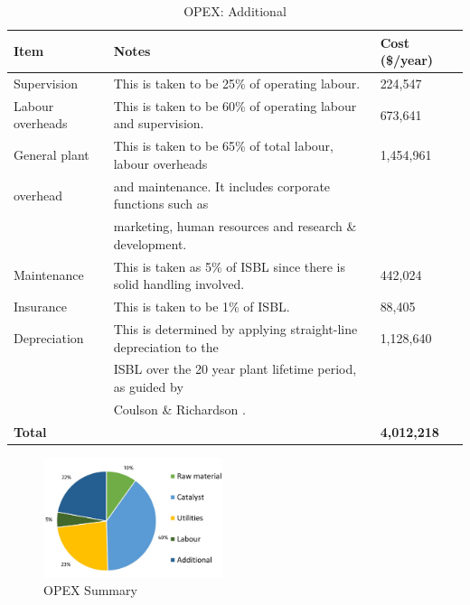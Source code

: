 \begin{table}[H]
\centering
\caption{OPEX: Additional}
\label{tab:opex-add}
\begin{tabular}{@{}lll@{}}
\toprule
\textbf{Item}          & \textbf{Notes}                                                          & \textbf{Cost (\$/year)} \\
\midrule
Supervision            & This is taken to be 25\% of operating labour.                           & 224,547                 \\ \midrule
Labour overheads       & This is taken to be 60\% of operating labour and supervision.           & 673,641                 \\ \midrule
General plant          & This is taken to be 65\% of total labour, labour overheads              & 1,454,961               \\ 
overhead               & and maintenance. It includes corporate functions such as                &                         \\ 
                       & marketing, human resources and research \& development.                 &                         \\ \midrule
Maintenance            & This is taken as 5\% of ISBL since there is solid handling   involved. & 442,024                 \\ \midrule
Insurance              & This is taken to be 1\% of ISBL.                                        & 88,405                  \\ \midrule
Depreciation           & This is determined by applying straight-line depreciation to the        & 1,128,640               \\ 
                       & ISBL over the 20 year plant lifetime period, as guided by               &                         \\ 
                       & Coulson \& Richardson \cite{sinnott_coulson_2005}.                                             &                         \\ \midrule
\textbf{Total}         & \textbf{}                                                               & \textbf{4,012,218}
\\\bottomrule
\end{tabular}
\end{table}

\begin{figure}
    \caption{OPEX Summary}
    \label{fig:OPEXSummary}
    \includegraphics[width=0.47\textwidth]{chapters/6-economics/figures/OPEX_summary.jpg}
\end{figure}

